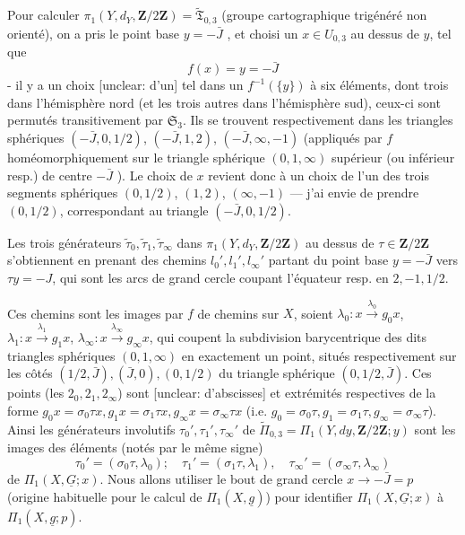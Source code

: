 \newpage


Pour calculer $\pi_1(Y, d_Y, \mathbf{Z}/2\mathbf{Z}) = \widetilde{\mathfrak{T}}_{0,3}$ (groupe cartographique trigénéré non orienté), on a pris le point base $y = -\bar{J}$ , et choisi un $x \in U_{0,3}$ au dessus de $y$, tel que
$$
f(x) = y = -\bar{J}
$$
- il y a un choix [unclear: d'un] tel dans un $f^{-1}(\{y\})$ à six éléments, dont trois dans l'hémisphère nord (et les trois autres dans l'hémisphère sud), ceux-ci sont permutés transitivement par $\mathfrak{S}_3$.
Ils se trouvent respectivement dans les triangles sphériques $(-\bar{J}, 0, 1/2)$, $(-\bar{J}, 1, 2)$, $(-\bar{J}, \infty, -1)$ (appliqués par $f$ homéomorphiquement sur le triangle sphérique $(0, 1, \infty)$ supérieur (ou inférieur resp.) de centre $-\bar{J}$ ). Le choix de $x$ revient donc à un choix de l'un des trois segments sphériques $(0, 1/2)$, $(1, 2)$, $(\infty, -1)$ — j'ai envie de prendre $(0, 1/2)$, correspondant au triangle $(-\bar{J}, 0, 1/2)$.

Les trois générateurs $\tilde{\tau}_0, \tilde{\tau}_1, \tilde{\tau}_\infty$ dans $\pi_1(Y, d_Y, \mathbf{Z}/2\mathbf{Z})$ au dessus de $\tau \in \mathbf{Z}/2\mathbf{Z}$ s'obtiennent en prenant des chemins $l_0', l_1', l_\infty'$ partant du point base $y = -\bar{J}$ vers $\tau y = -J$, qui sont les arcs de grand cercle coupant l'équateur resp. en $2, -1, 1/2$.

\newpage


Ces chemins sont les images par $f$ de chemins sur $X$, soient $\lambda_0: x \xrightarrow{\lambda_0} g_0 x$, $\lambda_1: x \xrightarrow{\lambda_1} g_1 x$, $\lambda_\infty: x \xrightarrow{\lambda_\infty} g_\infty x$, qui coupent la subdivision barycentrique des dits triangles sphériques $(0,1,\infty)$ en exactement un point, situés respectivement sur les côtés $(1/2, \bar{J}), (\bar{J}, 0), (0, 1/2)$ du triangle sphérique $(0, 1/2, \bar{J})$. Ces points (les $2_0, 2_1, 2_\infty$) sont [unclear: d'abscisses] et extrémités respectives de la forme $g_0 x = \sigma_0 \tau x, g_1 x = \sigma_1 \tau x, g_\infty x = \sigma_\infty \tau x$ (i.e. $g_0 = \sigma_0 \tau, g_1 = \sigma_1 \tau, g_\infty = \sigma_\infty \tau$). Ainsi les générateurs involutifs $\tau_0', \tau_1', \tau_\infty'$ de $\widetilde{\Pi}_{0,3} = \Pi_1(Y, dy, \mathbf{Z}/2\mathbf{Z}; y)$ sont les images des éléments (notés par le même signe)
$$ \tau_0' = (\sigma_0 \tau, \lambda_0) ; \quad \tau_1' = (\sigma_1 \tau, \lambda_1), \quad \tau_\infty' = (\sigma_\infty \tau, \lambda_\infty) $$
de $\Pi_1(X, \underline{G} ; x)$. Nous allons utiliser le bout de grand cercle $x \to -\bar{J} = p$ (origine habituelle pour le calcul de $\Pi_1(X, \underline{g})$) pour identifier $\Pi_1(X, \underline{G} ; x)$ à $\Pi_1(X, \underline{g} ; p)$.

